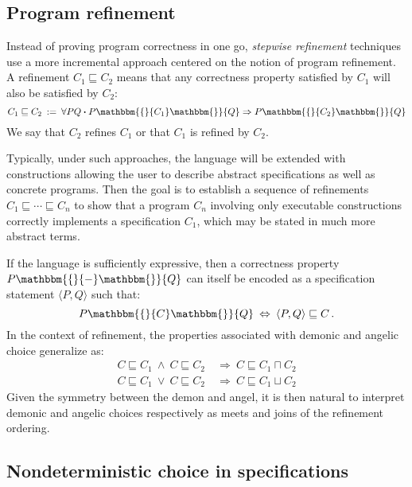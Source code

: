\documentclass[draft,11pt]{report}
\newcommand{\bdot}{\boldsymbol{\cdot}}
\newcommand{\htr}[3]{{ {#1} \mathbbm{\{} {#2} \mathbbm{\}} {#3} }}
\begin{document}

\subsection{Program refinement} %

Instead of proving program correctness in one go,
\emph{stepwise refinement} techniques use a more incremental approach
centered on the notion of program refinement.
A refinement $C_1 \sqsubseteq C_2$
means that any correctness property satisfied by $C_1$
will also be satisfied by $C_2$:
\[
    C_1 \sqsubseteq C_2 \: := \:
    \forall P Q \bdot
      \htr{P}{C_1}{Q} \Rightarrow
      \htr{P}{C_2}{Q}
\]
We say that $C_2$ refines $C_1$
or that $C_1$ is refined by $C_2$.

Typically,
under such approaches,
the language will be extended with constructions
allowing the user to describe
abstract specifications as well as
concrete programs.
Then the goal is to establish
a sequence of refinements
$C_1 \sqsubseteq \cdots \sqsubseteq C_n$
to show that a program $C_n$ involving
only executable constructions
correctly implements a specification $C_1$,
which may be stated in much more abstract terms.

If the language is sufficiently expressive,
then a correctness property $\htr{P}{-}{Q}$
can itself be encoded \citep{specstm} as
a specification statement $\langle{}P,Q{}\rangle$
such that:
\[
    \htr{P}{C}{Q} \: \Leftrightarrow \:
    \langle{}P,Q{}\rangle \sqsubseteq C \,.
\]
In the context of refinement,
the properties associated with demonic and angelic choice
generalize as:
\begin{align*}
  C \sqsubseteq C_1 \:\wedge\: C \sqsubseteq C_2 &
    \:\Rightarrow\: C \sqsubseteq C_1 \sqcap C_2 \\
  C \sqsubseteq C_1 \:\vee\: C \sqsubseteq C_2 &
    \:\Rightarrow\: C \sqsubseteq C_1 \sqcup C_2
\end{align*}
Given the symmetry between the demon and angel,
it is then natural to interpret demonic and angelic choices
respectively as meets and joins
of the refinement ordering.

\subsection{Nondeterministic choice in specifications}
\end{document}
